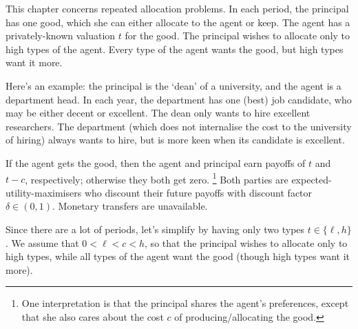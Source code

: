 






This chapter concerns repeated allocation problems.
In each period, the principal has one good, which she can either allocate to the agent or keep.
The agent has a privately-known valuation $t$ for the good.
The principal wishes to allocate only to high types of the agent.
Every type of the agent wants the good, but high types want it more.

Here's an example: the principal is the `dean' of a university, and the agent is a department head. In each year, the department has one (best) job candidate, who may be either decent or excellent.
The dean only wants to hire excellent researchers.
The department (which does not internalise the cost to the university of hiring) always wants to hire, but is more keen when its candidate is excellent.

If the agent gets the good, then the agent and principal earn payoffs of $t$ and $t-c$, respectively; otherwise they both get zero.%
	\footnote{One interpretation is that the principal shares the agent's preferences, except that she also cares about the cost $c$ of producing/allocating the good.}
Both parties are expected-utility-maximisers who discount their future payoffs with discount factor $\delta \in (0,1)$.
Monetary transfers are unavailable.

Since there are a lot of periods, let's simplify by having only two types $t \in \{\ell,h\}$.
We assume that $0 < \ell < c < h$,
so that the principal wishes to allocate only to high types,
while all types of the agent want the good (though high types want it more).

